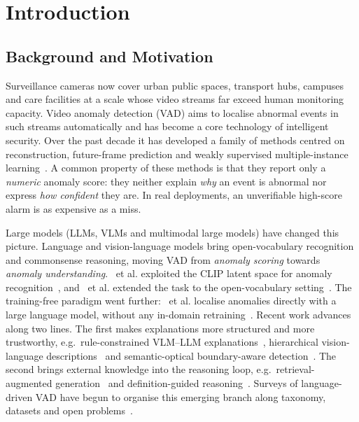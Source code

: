 \section{Introduction}
\label{sec:intro}

\subsection{Background and Motivation}

Surveillance cameras now cover urban public spaces, transport hubs, campuses and care facilities at a scale whose video streams far exceed human monitoring capacity. Video anomaly detection (VAD) aims to localise abnormal events in such streams automatically and has become a core technology of intelligent security. Over the past decade it has developed a family of methods centred on reconstruction, future-frame prediction and weakly supervised multiple-instance learning~\cite{abdalla2025vad10years,pravalika2026surveillance,houssein2026violence}. A common property of these methods is that they report only a \emph{numeric} anomaly score: they neither explain \emph{why} an event is abnormal nor express \emph{how confident} they are. In real deployments, an unverifiable high-score alarm is as expensive as a miss.

Large models (LLMs, VLMs and multimodal large models) have changed this picture. Language and vision-language models bring open-vocabulary recognition and commonsense reasoning, moving VAD from \emph{anomaly scoring} towards \emph{anomaly understanding}. \citeauthor{zanella2024clip}~et al. exploited the CLIP latent space for anomaly recognition~\cite{zanella2024clip}, and \citeauthor{wu2024openvocab}~et al. extended the task to the open-vocabulary setting~\cite{wu2024openvocab}. The training-free paradigm went further: \citeauthor{zanella2024trainingfree}~et al. localise anomalies directly with a large language model, without any in-domain retraining~\cite{zanella2024trainingfree}. Recent work advances along two lines. The first makes explanations more structured and more trustworthy, e.g.\ rule-constrained VLM--LLM explanations~\cite{khedher2025trustworthy}, hierarchical vision-language descriptions~\cite{alradi2026hierarchical} and semantic-optical boundary-aware detection~\cite{sun2026sorbdnet}. The second brings external knowledge into the reasoning loop, e.g.\ retrieval-augmented generation~\cite{sun2026rag4vad} and definition-guided reasoning~\cite{pei2026drvad}. Surveys of language-driven VAD have begun to organise this emerging branch along taxonomy, datasets and open problems~\cite{saket2026languagedriven}.

